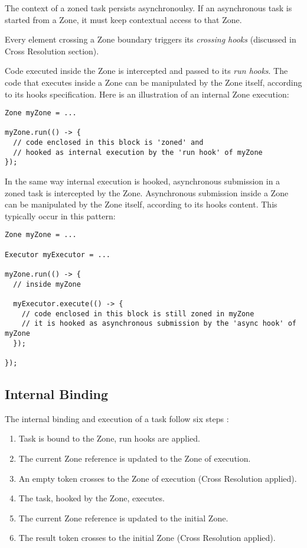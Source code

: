 The context of a zoned task persists asynchronoulsy. If an asynchronous task is started from a Zone, it must keep contextual access to that Zone.

Every element crossing a Zone boundary triggers its \emph{crossing hooks} (discussed in Cross Resolution section).

Code executed inside the Zone is intercepted and passed to its \emph{run hooks}. The code that executes inside a Zone can be manipulated by the Zone itself, according to its hooks specification. Here is an illustration of an internal Zone execution:

\begin{lstlisting}
Zone myZone = ...

myZone.run(() -> {
  // code enclosed in this block is 'zoned' and
  // hooked as internal execution by the 'run hook' of myZone
});
\end{lstlisting}

In the same way internal execution is hooked, asynchronous submission in a zoned task is intercepted by the Zone.
Asynchronous submission inside a Zone can be manipulated by the Zone itself, according to its hooks content. This typically occur in this pattern:

\begin{lstlisting}
Zone myZone = ...

Executor myExecutor = ...

myZone.run(() -> {
  // inside myZone

  myExecutor.execute(() -> {
    // code enclosed in this block is still zoned in myZone
    // it is hooked as asynchronous submission by the 'async hook' of myZone
  });
  
});
\end{lstlisting}

\subsection*{Internal Binding}

The internal binding and execution of a task follow six steps :
\begin{enumerate}
\item Task is bound to the Zone, run hooks are applied.
\item The current Zone reference is updated to the Zone of execution.
\item An empty token crosses to the Zone of execution (Cross Resolution applied).
\item The task, hooked by the Zone, executes.
\item The current Zone reference is updated to the initial Zone.
\item The result token crosses to the initial Zone (Cross Resolution applied).
\end{enumerate}

